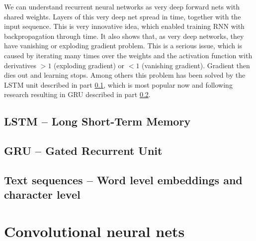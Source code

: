 We can understand recurrent neural networks as very deep forward nets with shared weights. Layers of this very deep net spread in time, together with the input sequence. This is very innovative idea, which enabled training RNN with backpropagation through time. It also shows that, as very deep networks, they have vanishing or exploding gradient problem. This is a serious issue, which is caused by iterating many times over the weights and the activation function with derivatives $>1$ (exploding gradient) or $<1$ (vanishing gradient). Gradient then dies out and learning stops. Among others this problem has been solved by the LSTM unit described in part \ref{subsec:lstm}, which is most popular now and following research resulting in GRU described in part \ref{subsec:gru}.



		\subsection{LSTM -- Long Short-Term Memory}\label{subsec:lstm}
\cite{Hochreiter:1997:LSM:1246443.1246450}

		\subsection{GRU -- Gated Recurrent Unit}\label{subsec:gru}
\cite{DBLP:journals/corr/ChoMGBSB14}
\cite{DBLP:journals/corr/GreffSKSS15}

		\subsection{Text sequences -- Word level embeddings and character level}

	\section{Convolutional neural nets}

